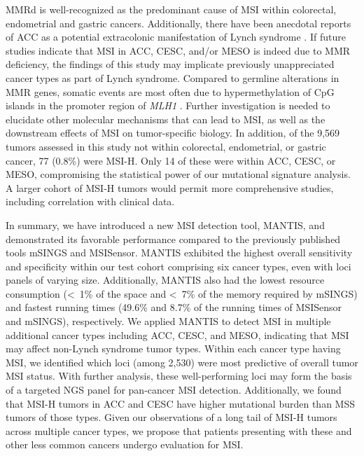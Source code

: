 MMRd is well-recognized as the predominant cause of MSI within colorectal, endometrial and gastric cancers. Additionally, there have been anecdotal reports of ACC as a potential extracolonic manifestation of Lynch syndrome \cite{challis2016,raymond2013}. If future studies indicate that MSI in ACC, CESC, and/or MESO is indeed due to MMR deficiency, the findings of this study may implicate previously unappreciated cancer types as part of Lynch syndrome. Compared to germline alterations in MMR genes, somatic events are most often due to hypermethylation of CpG islands in the promoter region of \textit{MLH1} \cite{boland1998}. Further investigation is needed to elucidate other molecular mechanisms that can lead to MSI, as well as the downstream effects of MSI on tumor-specific biology. In addition, of the 9,569 tumors assessed in this study not within colorectal, endometrial, or gastric cancer, 77 (0.8\%) were MSI-H\@. Only 14 of these were within ACC, CESC, or MESO, compromising the statistical power of our mutational signature analysis. A larger cohort of MSI-H tumors would permit more comprehensive studies, including correlation with clinical data.

In summary, we have introduced a new MSI detection tool, MANTIS, and demonstrated its favorable performance compared to the previously published tools mSINGS and MSISensor. MANTIS exhibited the highest overall sensitivity and specificity within our test cohort comprising six cancer types, even with loci panels of varying size. Additionally, MANTIS also had the lowest resource consumption (\textless{}~1\% of the space and \textless{}~7\% of the memory required by mSINGS) and fastest running times (49.6\% and 8.7\% of the running times of MSISensor and mSINGS), respectively. We applied MANTIS to detect MSI in multiple additional cancer types including ACC, CESC, and MESO, indicating that MSI may affect non-Lynch syndrome tumor types. Within each cancer type having MSI, we identified which loci (among 2,530) were most predictive of overall tumor MSI status. With further analysis, these well-performing loci may form the basis of a targeted NGS panel for pan-cancer MSI detection. Additionally, we found that MSI-H tumors in ACC and CESC have higher mutational burden than MSS tumors of those types. Given our observations of a long tail of MSI-H tumors across multiple cancer types, we propose that patients presenting with these and other less common cancers undergo evaluation for MSI\@.

